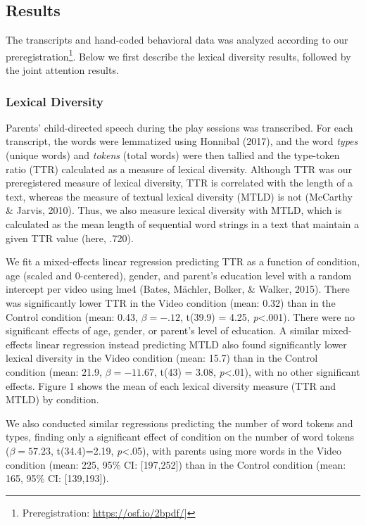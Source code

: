 \documentclass[]{article}
\let\rmarkdownfootnote\footnote%
\def\footnote{\protect\rmarkdownfootnote}
\begin{document}
\hypertarget{results}{%
\subsection{Results}\label{results}}

The transcripts and hand-coded behavioral data was analyzed according to
our preregistration\footnote{Preregistration:
  \url{https://osf.io/2bpdf/}{]}}. Below we first describe the lexical
diversity results, followed by the joint attention results.

\hypertarget{lexical-diversity}{%
\subsubsection{Lexical Diversity}\label{lexical-diversity}}

Parents' child-directed speech during the play sessions was transcribed.
For each transcript, the words were lemmatized using Honnibal (2017),
and the word \emph{types} (unique words) and \emph{tokens} (total words)
were then tallied and the type-token ratio (TTR) calculated as a measure
of lexical diversity. Although TTR was our preregistered measure of
lexical diversity, TTR is correlated with the length of a text, whereas
the measure of textual lexical diversity (MTLD) is not (McCarthy \&
Jarvis, 2010). Thus, we also measure lexical diversity with MTLD, which
is calculated as the mean length of sequential word strings in a text
that maintain a given TTR value (here, .720).

We fit a mixed-effects linear regression predicting TTR as a function of
condition, age (scaled and 0-centered), gender, and parent's education
level with a random intercept per video using lme4 (Bates, Mächler,
Bolker, \& Walker, 2015). There was significantly lower TTR in the Video
condition (mean: 0.32) than in the Control condition (mean: 0.43,
\(\beta=-.12\), t(39.9) = 4.25, \emph{p}\textless{}.001). There were no
significant effects of age, gender, or parent's level of education. A
similar mixed-effects linear regression instead predicting MTLD also
found significantly lower lexical diversity in the Video condition
(mean: 15.7) than in the Control condition (mean: 21.9,
\(\beta=-11.67\), t(43) = 3.08, \emph{p}\textless{}.01), with no other
significant effects. Figure 1 shows the mean of each lexical diversity
measure (TTR and MTLD) by condition.

We also conducted similar regressions predicting the number of word
tokens and types, finding only a significant effect of condition on the
number of word tokens (\(\beta=57.23\), t(34.4)=2.19,
\emph{p}\textless{}.05), with parents using more words in the Video
condition (mean: 225, 95\% CI: {[}197,252{]}) than in the Control
condition (mean: 165, 95\% CI: {[}139,193{]}).
\end{document}
